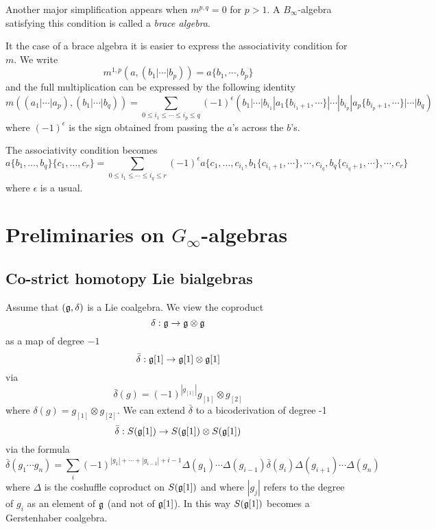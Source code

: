 \documentclass{amsart}
\numberwithin{equation}{section}
\theoremstyle{definition}
\theoremstyle{remark}
\begin{document}
\medskip

Another major simplification appears when  $m^{p,q}=0$ for $p>1$. 
A $B_\infty$-algebra satisfying this condition is called a \emph{brace algebra}. 

It the case of a brace algebra it is easier to express the associativity
condition for $m$.  We write
\[
m^{1,p}(a,(b_1|\cdots |b_p))=a\{b_1,\cdots, b_p\}
\]
and the full multiplication can be expressed by the following identity
\[
m((a_1|\cdots|a_p),(b_1|\cdots|b_q))
=\sum_{0\le i_1\le \cdots\le i_p\le q}
(-1)^\epsilon (b_1|\cdots |b_{i_1}| a_1\{b_{i_1+1},\cdots\}|
\cdots |b_{i_p}| a_p\{b_{i_p+1},\cdots\}|\cdots |b_q)
\]
where $(-1)^\epsilon$ is the sign obtained from passing the $a$'s across the $b$'s.

The associativity condition becomes
\[
a\{b_1,\ldots,b_q\}\{c_1,\ldots,c_r\}
=
\sum_{0\le i_1\le \cdots\le i_q\le r}
(-1)^\epsilon a\{c_1,\ldots,c_{i_1}, b_1\{c_{i_1+1},\cdots\},
\cdots ,c_{i_q}, b_q\{c_{i_q+1},\cdots\},\cdots ,c_r\}
\]
where $\epsilon$ is a usual. 

\section{Preliminaries on $G_\infty$-algebras}
\label{ref-4-3}

\subsection{Co-strict homotopy Lie bialgebras}
\label{ref-4.1-4}
Assume that $(\frak{g},\delta)$ is a Lie coalgebra.
We view the coproduct
\[
\delta:\frak{g}\rightarrow \frak{g}\otimes \frak{g}
\]
as a map of degree $-1$
\[
\bar{\delta}:\frak{g}[1]\rightarrow \frak{g}[1]\otimes \frak{g}[1]
\]
via
\[
\bar{\delta}(g)=(-1)^{|g_{[1]}|}g_{[1]}\otimes g_{[2]}
\]
where $\delta(g)=g_{[1]}\otimes g_{[2]}$.
We can extend $\bar{\delta}$ to  a bicoderivation of degree -1
\[
\bar{\delta}:S(\frak{g}[1])\rightarrow S(\frak{g}[1])\otimes S(\frak{g}[1])
\]
via the formula 
\begin{equation}
\label{ref-4.1-5}
\bar{\delta}(g_1\cdots g_n)=\sum_{i}(-1)^{|g_1|+\cdots+|g_{i-1}|+i-1}
\Delta(g_1)\cdots \Delta(g_{i-1})\bar{\delta}(g_i)\Delta(g_{i+1})
\cdots \Delta(g_n)
\end{equation}
where $\Delta$ is the coshuffle coproduct on $S(\frak{g}[1])$ and
where $|g_j|$ refers to the degree of $g_i$ as an element of $\frak{g}$
(and not of $\frak{g}[1]$).  In this way $S(\frak{g}[1])$ becomes a
Gerstenhaber coalgebra.
\end{document}
